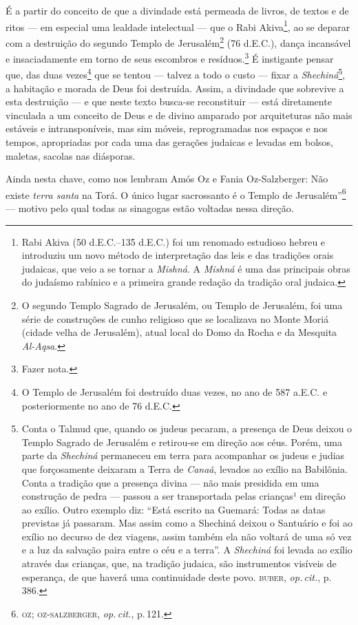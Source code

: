 É a partir do conceito de que a divindade está permeada de livros, de
textos e de ritos --- em especial uma lealdade intelectual --- que o
Rabi Akiva\footnote{Rabi Akiva (50 d.E.C.--135 d.E.C.) foi um renomado
  estudioso hebreu e introduziu um novo método de interpretação das leis
  e das tradições orais judaicas, que veio a se tornar a \emph{Mishná}. A \emph{Mishná} é uma das principais obras do judaísmo rabínico
  e a primeira grande redação da tradição oral judaica.}, ao se deparar
com a destruição do segundo Templo de Jerusalém\footnote{O segundo
  Templo Sagrado de Jerusalém, ou Templo de Jerusalém, foi uma série de
  construções de cunho religioso que se localizava no Monte
Moriá (cidade velha de Jerusalém), atual local do Domo da
  Rocha e da Mesquita \emph{Al-Aqsa}.} (76 d.E.C.), dança incansável e
insaciadamente em torno de seus escombros e resíduos.\footnote{Fazer nota.} É instigante
pensar que, das duas vezes\footnote{O Templo de Jerusalém foi destruído
  duas vezes, no ano de 587 a.E.C. e posteriormente no ano de 76 d.E.C.}
que se tentou --- talvez a todo o custo --- fixar a
\emph{Shechiná}\footnote{Conta o Talmud que, quando os judeus
  pecaram, a presença de Deus deixou o Templo Sagrado de Jerusalém e
  retirou-se em direção aos céus. Porém, uma parte da \emph{Shechiná}
  permaneceu em terra para acompanhar os judeus e judias que
  forçosamente deixaram a Terra de \emph{Canaã}, levados ao exílio na
  Babilônia. Conta a tradição que a presença divina --- não mais
  presidida em uma construção de pedra --- passou a ser transportada
  pelas crianças¹ em direção ao exílio. Outro exemplo diz: ``Está
  escrito na Guemará: Todas as datas previstas já passaram. Mas assim
  como a Shechiná deixou o Santuário e foi ao exílio no decurso de dez
  viagens, assim também ela não voltará de uma só vez e a luz da
  salvação paira entre o céu e a terra''. A \emph{Shechiná} foi levada ao exílio através das crianças,
  que, na tradição judaica, são instrumentos visíveis de esperança, de
  que haverá uma continuidade deste povo. \textsc{buber}, \emph{op.\,cit.}, p.\,386.}, a habitação e morada de Deus foi
destruída. Assim, a divindade que sobrevive a esta destruição --- e que
neste texto busca-se reconstituir --- está diretamente vinculada a um
conceito de Deus e de divino amparado por arquiteturas não mais estáveis
e intransponíveis, mas sim móveis, reprogramadas nos espaços e nos
tempos, apropriadas por cada uma das gerações judaicas e levadas em
bolsos, maletas, sacolas nas diásporas.

Ainda nesta chave, como nos lembram Amós Oz e Fania Oz-Salzberger:
Não existe \emph{terra santa} na Torá. O único lugar sacrossanto é o
Templo de Jerusalém''\footnote{\textsc{oz; oz-salzberger}, \emph{op.\,cit.}, p.\,121.}
--- motivo pelo qual todas as sinagogas estão voltadas nessa direção.

